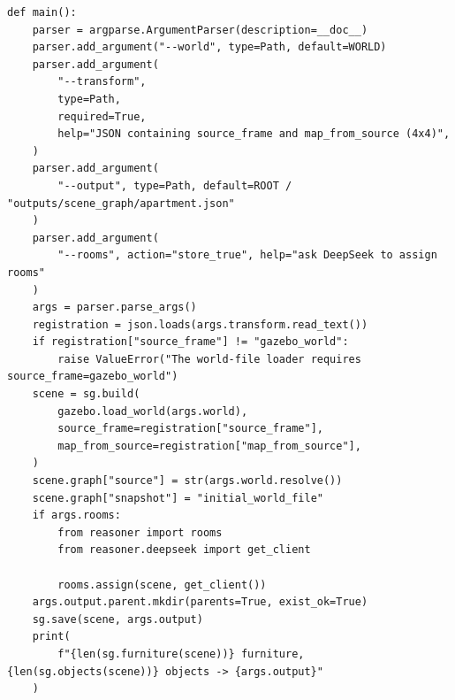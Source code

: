 \documentclass[11pt,a4paper]{book}
\begin{document}
\begin{lstlisting}[firstnumber=12]
def main():
    parser = argparse.ArgumentParser(description=__doc__)
    parser.add_argument("--world", type=Path, default=WORLD)
    parser.add_argument(
        "--transform",
        type=Path,
        required=True,
        help="JSON containing source_frame and map_from_source (4x4)",
    )
    parser.add_argument(
        "--output", type=Path, default=ROOT / "outputs/scene_graph/apartment.json"
    )
    parser.add_argument(
        "--rooms", action="store_true", help="ask DeepSeek to assign rooms"
    )
    args = parser.parse_args()
    registration = json.loads(args.transform.read_text())
    if registration["source_frame"] != "gazebo_world":
        raise ValueError("The world-file loader requires source_frame=gazebo_world")
    scene = sg.build(
        gazebo.load_world(args.world),
        source_frame=registration["source_frame"],
        map_from_source=registration["map_from_source"],
    )
    scene.graph["source"] = str(args.world.resolve())
    scene.graph["snapshot"] = "initial_world_file"
    if args.rooms:
        from reasoner import rooms
        from reasoner.deepseek import get_client

        rooms.assign(scene, get_client())
    args.output.parent.mkdir(parents=True, exist_ok=True)
    sg.save(scene, args.output)
    print(
        f"{len(sg.furniture(scene))} furniture, {len(sg.objects(scene))} objects -> {args.output}"
    )


\end{lstlisting}
\end{document}
